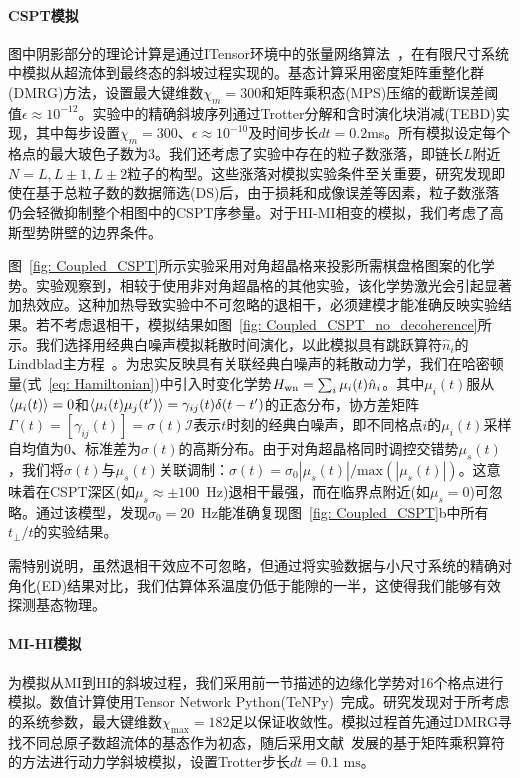 \documentclass[preprint,superscriptaddress,floatfix, nofootinbib]{revtex4-2}
\begin{document}
\begin{CJK*}{UTF8}{gbsn}
\paragraph*{CSPT模拟} 图中阴影部分的理论计算是通过ITensor环境中的张量网络算法~\cite{itensor}，在有限尺寸系统中模拟从超流体到最终态的斜坡过程实现的。基态计算采用密度矩阵重整化群(DMRG)方法，设置最大键维数$\chi_m=300$和矩阵乘积态(MPS)压缩的截断误差阈值$\epsilon \approx 10^{-12}$。实验中的精确斜坡序列通过Trotter分解和含时演化块消减(TEBD)实现，其中每步设置$\chi_m=300$、$\epsilon \approx 10^{-10}$及时间步长$dt=0.2$ms。所有模拟设定每个格点的最大玻色子数为3。我们还考虑了实验中存在的粒子数涨落，即链长$L$附近$N=L, L\pm1, L\pm2$粒子的构型。这些涨落对模拟实验条件至关重要，研究发现即使在基于总粒子数的数据筛选(DS)后，由于损耗和成像误差等因素，粒子数涨落仍会轻微抑制整个相图中的CSPT序参量。对于HI-MI相变的模拟，我们考虑了高斯型势阱壁的边界条件。

图~\ref{fig: Coupled_CSPT}所示实验采用对角超晶格来投影所需棋盘格图案的化学势。实验观察到，相较于使用非对角超晶格的其他实验，该化学势激光会引起显著加热效应。这种加热导致实验中不可忽略的退相干，必须建模才能准确反映实验结果。若不考虑退相干，模拟结果如图~\ref{fig: Coupled_CSPT_no_decoherence}所示。我们选择用经典白噪声模拟耗散时间演化，以此模拟具有跳跃算符$\hat n_i$的Lindblad主方程~\cite{Kampen1992, Seif2022}。为忠实反映具有关联经典白噪声的耗散动力学，我们在哈密顿量(式~\eqref{eq: Hamiltonian})中引入时变化学势$H_{\rm wn}=\sum_i \mu_i(t) \hat  n_i$。其中$\mu_i(t)$服从$\braket{\mu_i(t)}=0$和$\braket{\mu_i(t)\mu_j(t')}=\gamma_{ij}(t) \delta(t-t')$的正态分布，协方差矩阵$\Gamma(t)=\left[\gamma_{ij}(t)\right]=\sigma(t)\mathcal{I}$表示$t$时刻的经典白噪声，即不同格点$i$的$\mu_i(t)$采样自均值为0、标准差为$\sigma(t)$的高斯分布。由于对角超晶格同时调控交错势$\mu_s(t)$，我们将$\sigma(t)$与$\mu_s(t)$关联调制：$\sigma(t)=\sigma_0 |\mu_s(t)|/\textrm{max}(|\mu_s(t)|)$。这意味着在CSPT深区(如$\mu_s \approx \pm 100$~Hz)退相干最强，而在临界点附近(如$\mu_s=0$)可忽略。通过该模型，发现$\sigma_0=20$~Hz能准确复现图~\ref{fig: Coupled_CSPT}b中所有$t_\perp/t$的实验结果。

需特别说明，虽然退相干效应不可忽略，但通过将实验数据与小尺寸系统的精确对角化(ED)结果对比，我们估算体系温度仍低于能隙的一半，这使得我们能够有效探测基态物理。

\paragraph*{MI-HI模拟} 为模拟从MI到HI的斜坡过程，我们采用前一节描述的边缘化学势对16个格点进行模拟。数值计算使用Tensor Network Python(TeNPy)~\cite{Hauschild18}完成。研究发现对于所考虑的系统参数，最大键维数$\chi_{\text{max}} = 182$足以保证收敛性。模拟过程首先通过DMRG寻找不同总原子数超流体的基态作为初态，随后采用文献~\cite{Zaletel2015}发展的基于矩阵乘积算符的方法进行动力学斜坡模拟，设置Trotter步长$dt = 0.1 \text{ ms}$。

\end{CJK*}
\end{document}
